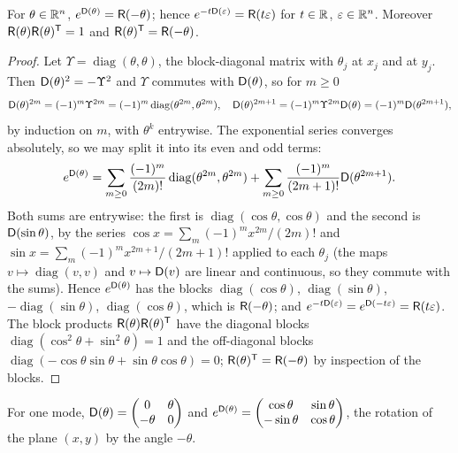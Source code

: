 \begin{lemma}\label{lem:block-rot}
For $\theta\in\mathbb R^n$, $e^{\mathsf D(\theta)}=\mathsf R(-\theta)$; hence $e^{-t\mathsf D(\varepsilon)}=\mathsf R(t\varepsilon)$
for $t\in\mathbb R$, $\varepsilon\in\mathbb R^n$. Moreover $\mathsf R(\theta)\mathsf R(\theta)^{\mathsf T}=1$ and
$\mathsf R(\theta)^{\mathsf T}=\mathsf R(-\theta)$.
\end{lemma}
\begin{proof}
Let $\Upsilon=\operatorname{diag}(\theta,\theta)$, the block-diagonal matrix with $\theta_j$ at $x_j$
and at $y_j$. Then $\mathsf D(\theta)^2=-\Upsilon^2$ and $\Upsilon$ commutes with $\mathsf D(\theta)$, so for $m\geq0$
\[
 \mathsf D(\theta)^{2m}=(-1)^m\Upsilon^{2m}=(-1)^m\operatorname{diag}(\theta^{2m},\theta^{2m}),\quad
 \mathsf D(\theta)^{2m+1}=(-1)^m\Upsilon^{2m}\mathsf D(\theta)=(-1)^m\mathsf D(\theta^{2m+1}),
\]
by induction on $m$, with $\theta^{k}$ entrywise. The exponential series converges
absolutely, so we may split it into its even and odd terms:
\[
 e^{\mathsf D(\theta)}=\sum_{m\geq0}\frac{(-1)^m}{(2m)!}\operatorname{diag}(\theta^{2m},\theta^{2m})
 +\sum_{m\geq0}\frac{(-1)^m}{(2m+1)!}\mathsf D(\theta^{2m+1}).
\]
Both sums are entrywise: the first is $\operatorname{diag}(\cos\theta,\cos\theta)$ and the
second is $\mathsf D(\sin\theta)$, by the series $\cos x=\sum_m(-1)^mx^{2m}/(2m)!$ and
$\sin x=\sum_m(-1)^mx^{2m+1}/(2m+1)!$ applied to each $\theta_j$ (the maps
$v\mapsto\operatorname{diag}(v,v)$ and $v\mapsto\mathsf D(v)$ are linear and continuous, so they
commute with the sums). Hence $e^{\mathsf D(\theta)}$ has the blocks $\operatorname{diag}(\cos\theta)$,
$\operatorname{diag}(\sin\theta)$, $-\operatorname{diag}(\sin\theta)$,
$\operatorname{diag}(\cos\theta)$, which is $\mathsf R(-\theta)$; and
$e^{-t\mathsf D(\varepsilon)}=e^{\mathsf D(-t\varepsilon)}=\mathsf R(t\varepsilon)$. The block products
$\mathsf R(\theta)\mathsf R(\theta)^{\mathsf T}$ have the diagonal blocks
$\operatorname{diag}(\cos^2\theta+\sin^2\theta)=1$ and the off-diagonal blocks
$\operatorname{diag}(-\cos\theta\sin\theta+\sin\theta\cos\theta)=0$;
$\mathsf R(\theta)^{\mathsf T}=\mathsf R(-\theta)$ by inspection of the blocks.
\end{proof}
For one mode, $\mathsf D(\theta)=\begin{pmatrix}0&\theta\\-\theta&0\end{pmatrix}$ and
$e^{\mathsf D(\theta)}=\begin{pmatrix}\cos\theta&\sin\theta\\-\sin\theta&\cos\theta\end{pmatrix}$,
the rotation of the plane $(x,y)$ by the angle $-\theta$.

